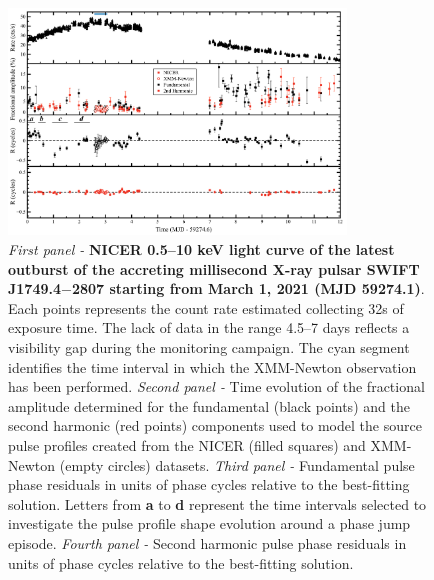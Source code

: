 \documentclass[fleqn,usenatbib]{mnras}
\newcommand{\swiftj}{SWIFT J1749.4$-$2807}
\newcommand{\nicer}{NICER}
\newcommand{\xmm}{XMM-Newton}
\begin{document}
\begin{figure}
\centering
\includegraphics[width=0.8\textwidth]{plot_lc_phase_residuals_ref}
\caption{\textit{First panel -} \textbf{\nicer{} 0.5--10 keV light curve of the latest outburst of the accreting millisecond X-ray pulsar \swiftj{} starting from March 1, 2021 (MJD 59274.1)}. Each points represents the count rate estimated collecting 32s of exposure time. The lack of data in the range 4.5--7 days reflects a visibility gap during the monitoring campaign. The cyan segment identifies the time interval in which the \xmm{} observation has been performed. \textit{Second panel -} Time evolution of the fractional amplitude determined for the fundamental (black points) and the second harmonic (red points) components used to model the source pulse profiles created from the \nicer{} (filled squares) and \xmm{} (empty circles) datasets. \textit{Third panel -} Fundamental pulse phase residuals in units of phase cycles relative to the best-fitting solution. Letters from \textbf{a} to \textbf{d} represent the time intervals selected to investigate the pulse profile shape evolution around a phase jump episode. \textit{Fourth panel -} Second harmonic pulse phase residuals in units of phase cycles relative to the best-fitting solution.}
\label{fig:phase_fit}
\end{figure} 


\end{document}
